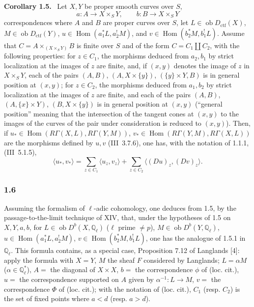 \documentclass[11pt]{article}
\newenvironment{statement}[1]{\par\medskip\noindent\textbf{#1.}\ }{\par\medskip}
\DeclareMathOperator{\Hom}{Hom}
\newcommand{\ob}{\operatorname{ob}}
\providecommand{\ctf}{\mathrm{ctf}}
\providecommand{\Hom}{\operatorname{Hom}}
\providecommand{\ob}{\operatorname{ob}}
\providecommand{\Hom}{\operatorname{Hom}}
\begin{document}
\begin{statement}{Corollary 1.5}
Let $X,Y$ be proper smooth curves over $S$,
\[
a:A\longrightarrow X\times_S Y,
\qquad
b:B\longrightarrow X\times_S Y
\]
correspondences where $A$ and $B$ are proper curves over $S$, let $L\in\ob D_{\ctf}(X)$, $M\in\ob D_{\ctf}(Y)$, $u\in\Hom(a_1^*L,a_2^!M)$, and $v\in\Hom(b_2^*M,b_1^!L)$. Assume that $C=A\times_{(X\times_S Y)}B$ is finite over $S$ and of the form $C=C_1\amalg C_2$, with the following properties: for $z\in C_1$, the morphisms deduced from $a_2,b_1$ by strict localization at the images of $z$ are finite, and, if $(x,y)$ denotes the image of $z$ in $X\times_S Y$, each of the pairs $(A,B)$, $(A,X\times\{y\})$, $(\{y\}\times Y,B)$ is in general position at $(x,y)$; for $z\in C_2$, the morphisms deduced from $a_1,b_2$ by strict localization at the images of $z$ are finite, and each of the pairs $(A,B)$, $(A,\{x\}\times Y)$, $(B,X\times\{y\})$ is in general position at $(x,y)$ (``general position'' meaning that the intersection of the tangent cones at $(x,y)$ to the images of the curves of the pair under consideration is reduced to $(x,y)$). Then, if $u_*\in\Hom(R\Gamma(X,L),R\Gamma(Y,M))$, $v_*\in\Hom(R\Gamma(Y,M),R\Gamma(X,L))$ are the morphisms defined by $u,v$ (III~3.7.6), one has, with the notation of 1.1.1, (III~5.1.5),
\begin{equation}\tag{1.5.1}
\langle u_*,v_*\rangle=\sum_{z\in C_1}\langle u_z,v_z\rangle+\sum_{z\in C_2}\langle (Du)_z,(Dv)_z\rangle.
\end{equation}
\end{statement}

\subsubsection*{1.6}
Assuming the formalism of $\ell$-adic cohomology, one deduces from 1.5, by the passage-to-the-limit technique of XIV, that, under the hypotheses of 1.5 on $X,Y,a,b$, for $L\in\ob D^b(X,\mathbb Q_\ell)$ ($\ell$ prime $\ne p$), $M\in\ob D^b(Y,\mathbb Q_\ell)$, $u\in\Hom(a_1^*L,a_2^!M)$, $v\in\Hom(b_2^*M,b_1^!L)$, one has the analogue of 1.5.1 in $\mathbb Q_\ell$. This formula contains, as a special case, Proposition 7.12 of Langlands [4]: apply the formula with $X=Y$, $M$ the sheaf $F$ considered by Langlands; $L=\alpha M$ ($\alpha\in\mathbb Q_\ell^*$), $A=$ the diagonal of $X\times X$, $b=$ the correspondence $\phi$ of (loc. cit.), $u=$ the correspondence supported on $A$ given by $\alpha^{-1}:L\to M$, $v=$ the correspondence $\Phi$ of (loc. cit.); with the notation of (loc. cit.), $C_1$ (resp. $C_2$) is the set of fixed points where $a<d$ (resp. $a>d$).
\end{document}
